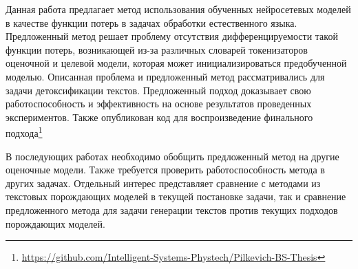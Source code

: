Данная работа предлагает метод использования обученных нейросетевых моделей в качестве функции потерь в задачах обработки естественного языка.
Предложенный метод решает проблему отсутствия дифференцируемости такой функции потерь, возникающей из-за различных словарей токенизаторов оценочной и целевой модели, которая может инициализироваться предобученной моделью.
Описанная проблема и предложенный метод рассматривались для задачи детоксификации текстов.
Предложенный подход доказывает свою работоспособность и эффективность на основе результатов проведенных экспериментов.  
Также опубликован код для воспроизведение финального подхода\footnote{\url{https://github.com/Intelligent-Systems-Phystech/Pilkevich-BS-Thesis}}

В последующих работах необходимо обобщить предложенный метод на другие оценочные модели. 
Также требуется проверить работоспособность метода в других задачах.
Отдельный интерес представляет сравнение с методами из текстовых порождающих моделей в текущей постановке задачи, так и сравнение предложенного метода для задачи генерации текстов против текущих подходов порождающих моделей. 